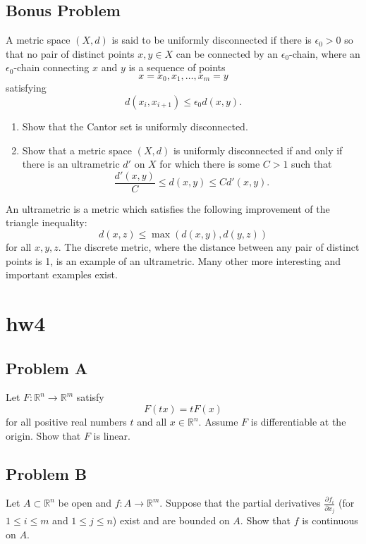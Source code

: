 \documentclass[lang=en,11pt]{template}
\begin{document}
\section*{Bonus Problem}
A metric space \( (X, d) \) is said to be uniformly disconnected if there is \( \epsilon_0 > 0 \) so that no pair of distinct points \( x, y \in X \) can be connected by an \( \epsilon_0 \)-chain, where an \( \epsilon_0 \)-chain connecting \( x \) and \( y \) is a sequence of points
\[
x = x_0, x_1, \dots, x_m = y
\]
satisfying
\[
d(x_i, x_{i+1}) \leq \epsilon_0 d(x, y).
\]
\begin{enumerate}
    \item Show that the Cantor set is uniformly disconnected.
    \item Show that a metric space \( (X, d) \) is uniformly disconnected if and only if there is an ultrametric \( d' \) on \( X \) for which there is some \( C > 1 \) such that
    \[
    \frac{d'(x, y)}{C} \leq d(x, y) \leq C d'(x, y).
    \]
\end{enumerate}
An ultrametric is a metric which satisfies the following improvement of the triangle inequality:
\[
d(x, z) \leq \max(d(x, y), d(y, z))
\]
for all \( x, y, z \). The discrete metric, where the distance between any pair of distinct points is 1, is an example of an ultrametric. Many other more interesting and important examples exist.





\chapter{hw4}

\section*{Problem A}
Let \( F : \mathbb{R}^n \to \mathbb{R}^m \) satisfy
\[
F(tx) = tF(x)
\]
for all positive real numbers \( t \) and all \( x \in \mathbb{R}^n \). Assume \( F \) is differentiable at the origin. Show that \( F \) is linear.

\section*{Problem B}
Let \( A \subset \mathbb{R}^n \) be open and \( f : A \to \mathbb{R}^m \). Suppose that the partial derivatives \( \frac{\partial f_i}{\partial x_j} \) (for \( 1 \leq i \leq m \) and \( 1 \leq j \leq n \)) exist and are bounded on \( A \). Show that \( f \) is continuous on \( A \).
\end{document}
